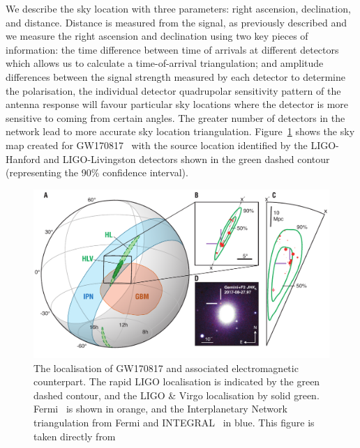 We describe the sky location with three parameters: right ascension, declination, and distance. Distance is measured from the \gwadj signal, as previously described and we  measure the right ascension and declination using two key pieces of information: the time difference between time of arrivals at different detectors which allows us to calculate a time-of-arrival triangulation; and amplitude differences between the signal strength measured by each detector to determine the \gwadj polarisation, the individual detector quadrupolar sensitivity pattern of the antenna response will favour particular sky locations where the detector is more sensitive to \gws coming from certain angles. The greater number of \gwadj detectors in the network lead to more accurate sky location triangulation. Figure~\ref{6:fig:gw170817_skymap} shows the sky map created for GW170817~\cite{gw170817_skymap:2017} with the source location identified by the LIGO-Hanford and LIGO-Livingston detectors shown in the green dashed contour (representing the 90\% confidence interval).
%
\begin{figure}
    \centering
    \includegraphics[width=1.0\linewidth]{images/6_earlywarning/gw170817/GW170817_skymap.pdf}
    \caption{The localisation of GW170817 and associated electromagnetic counterpart. The rapid LIGO localisation is indicated by the green dashed contour, and the LIGO \& Virgo localisation by solid green. Fermi~\cite{Fermi:2022} is shown in orange, and the Interplanetary Network triangulation from Fermi and INTEGRAL~\cite{INTEGRAL:2003} in blue. This figure is taken directly from~\cite{gw170817_skymap:2017}}
    \label{6:fig:gw170817_skymap}
\end{figure}
%

